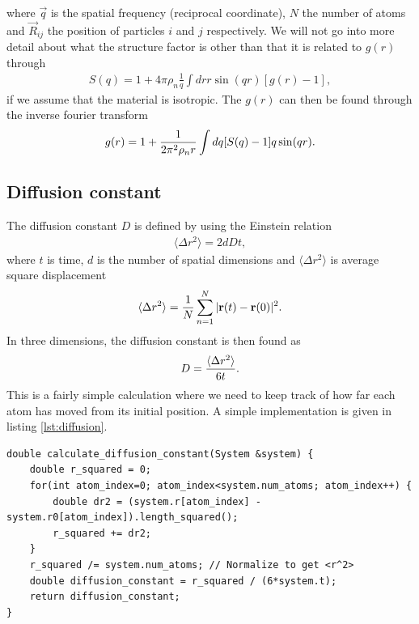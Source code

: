 where $\vec q$ is the spatial frequency (reciprocal coordinate), $N$ the number of atoms and $\vec R_{ij}$ the position of particles $i$ and $j$ respectively. We will not go into more detail about what the structure factor is other than that it is related to $g(r)$ through
\begin{align}
    S(q) = 1 + 4\pi\rho_n\frac{1}{q}\int dr r\sin(qr)[g(r) - 1],
\end{align}
if we assume that the material is isotropic\cite{kittel1996introduction}. The $g(r)$ can then be found through the inverse fourier transform
\begin{align}
    g(r) = 1 + {1\over 2\pi^2\rho_n r} \int dq[S(q) - 1]q\sin(qr).
\end{align}

\subsection{Diffusion constant}
The diffusion constant $D$ is defined by using the Einstein relation
\begin{align}
    \langle \Delta r^2 \rangle = 2dDt,
\end{align}
where $t$ is time, $d$ is the number of spatial dimensions and $\langle \Delta r^2 \rangle$ is average square displacement 
\begin{align}
    \langle \Delta r^2 \rangle = {1 \over N} \sum_{n=1}^N |\vec r(t) - \vec r(0)|^2.
\end{align}
In three dimensions, the diffusion constant is then found as
\begin{align}
    D = {\langle \Delta r^2 \rangle\over 6t}.
\end{align}
This is a fairly simple calculation where we need to keep track of how far each atom has moved from its initial position.  A simple implementation is given in listing \ref{lst:diffusion}.
\begin{lstlisting}[caption=Calculation of the diffusion constant., label=lst:diffusion]
double calculate_diffusion_constant(System &system) {
    double r_squared = 0;
    for(int atom_index=0; atom_index<system.num_atoms; atom_index++) {
        double dr2 = (system.r[atom_index] - system.r0[atom_index]).length_squared();
        r_squared += dr2;
    }
    r_squared /= system.num_atoms; // Normalize to get <r^2>
    double diffusion_constant = r_squared / (6*system.t);
    return diffusion_constant;
}
\end{lstlisting}
